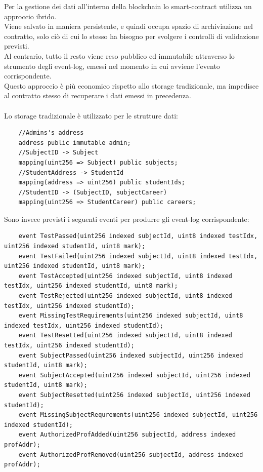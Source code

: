 Per la gestione dei dati all'interno della blockchain lo \gls{smart-contract} utilizza un approccio ibrido. \\
Viene salvato in maniera persistente, e quindi occupa spazio di archiviazione nel contratto, solo ciò di cui lo stesso ha bisogno per
svolgere i controlli di validazione previsti. \\
Al contrario, tutto il resto viene reso pubblico ed immutabile attraverso lo strumento degli \gls{event-log},
emessi nel momento in cui avviene l'evento corrispondente. \\
Questo approccio è più economico rispetto allo storage tradizionale, ma impedisce al contratto stesso di recuperare i dati emessi in precedenza. \\
\\
Lo storage tradizionale è utilizzato per le strutture dati:
\begin{verbatim}
    //Admins's address
    address public immutable admin;
    //SubjectID -> Subject
    mapping(uint256 => Subject) public subjects;
    //StudentAddress -> StudentId
    mapping(address => uint256) public studentIds;
    //StudentID -> (SubjectID, subjectCareer)
    mapping(uint256 => StudentCareer) public careers;
\end{verbatim}

Sono invece previsti i seguenti eventi per produrre gli \gls{event-log} corrispondente:

\begin{verbatim}
    event TestPassed(uint256 indexed subjectId, uint8 indexed testIdx, uint256 indexed studentId, uint8 mark);
    event TestFailed(uint256 indexed subjectId, uint8 indexed testIdx, uint256 indexed studentId, uint8 mark);
    event TestAccepted(uint256 indexed subjectId, uint8 indexed testIdx, uint256 indexed studentId, uint8 mark);
    event TestRejected(uint256 indexed subjectId, uint8 indexed testIdx, uint256 indexed studentId);
    event MissingTestRequirements(uint256 indexed subjectId, uint8 indexed testIdx, uint256 indexed studentId);
    event TestResetted(uint256 indexed subjectId, uint8 indexed testIdx, uint256 indexed studentId);
    event SubjectPassed(uint256 indexed subjectId, uint256 indexed studentId, uint8 mark);
    event SubjectAccepted(uint256 indexed subjectId, uint256 indexed studentId, uint8 mark);
    event SubjectResetted(uint256 indexed subjectId, uint256 indexed studentId);
    event MissingSubjectRequrements(uint256 indexed subjectId, uint256 indexed studentId);
    event AuthorizedProfAdded(uint256 subjectId, address indexed profAddr);
    event AuthorizedProfRemoved(uint256 subjectId, address indexed profAddr);
\end{verbatim}
